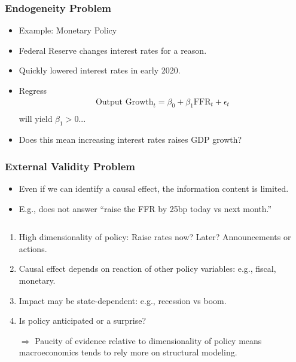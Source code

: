 \documentclass[english,xcolor=svgnames]{beamer}
\begin{document}
\begin{frame}
\frametitle[alignment=center]{Endogeneity Problem}
\begin{itemize}
	\item Example: Monetary Policy
	\item Federal Reserve changes interest rates for a reason.
	\item Quickly lowered interest rates in early 2020.
	\item Regress
	\begin{align*}
		\text{Output Growth}_t = \beta_0 +\beta_1 \text{FFR}_t + \epsilon_t \\
	\end{align*}
	will yield $\beta_1>0$...
	\item Does this mean increasing interest rates raises GDP growth?
\end{itemize}
\end{frame}

\begin{frame}
\frametitle[alignment=center]{External Validity Problem}
\begin{itemize}
	\item Even if we can identify a causal effect, the information content is limited.
	\item E.g., does not answer ``raise the FFR by 25bp today vs next month.''
\end{itemize}
$\;$
\begin{enumerate}
	\item High dimensionality of policy: Raise rates now? Later? Announcements or actions.
	\item Causal effect depends on reaction of other policy variables: e.g., fiscal, monetary.
	\item Impact may be state-dependent: e.g., recession vs boom.
	\item Is policy anticipated or a surprise?
\end{enumerate}
\begin{itemize}
	\item[$\Rightarrow$] Paucity of evidence relative to dimensionality of policy means macroeconomics tends to rely more on structural modeling.
\end{itemize}
\end{frame}
\end{document}
